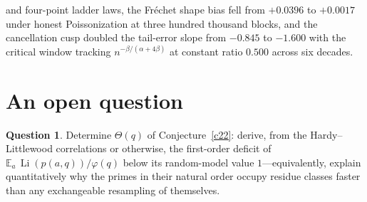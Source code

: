 \documentclass[11pt]{article}
\theoremstyle{definition}
\newtheorem{question}{Question}
\newcommand{\Li}{\operatorname{Li}}
\begin{document}
and four-point ladder laws, the Fr\'echet shape bias fell from $+0.0396$ to $+0.0017$ under honest Poissonization at three hundred thousand blocks, and the cancellation cusp doubled the tail-error slope from $-0.845$ to $-1.600$ with the critical window tracking $n^{-\beta/(\alpha+4\beta)}$ at constant ratio $0.500$ across six decades.

\section{An open question}

\begin{question}\label{q:theta}
Determine $\Theta(q)$ of Conjecture~\ref{c22}: derive, from the
Hardy--Littlewood correlations or otherwise, the first-order deficit of
$\mathbb E_a\,\Li(p(a,q))/\varphi(q)$ below its random-model value
$1$---equivalently, explain quantitatively why the primes in their
natural order occupy residue classes faster than any exchangeable
resampling of themselves.
\end{question}
\end{document}
